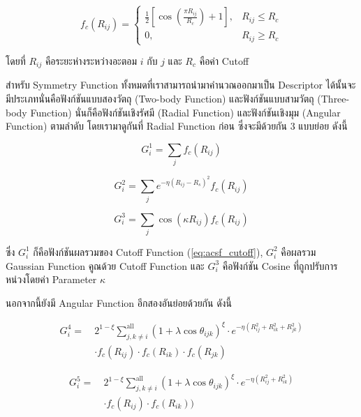 \begin{equation}
    \label{eq:acsf_cutoff}
    f_{c}(R_{ij}) = 
    \begin{cases}
        \frac{1}{2}[\cos(\frac{\pi R_{ij}}{R_{c}}) + 1], & R_{ij} \le R_{c} \\
        0,                                             & R_{ij} \ge R_{c}
    \end{cases}
\end{equation}

\noindent โดยที่ $R_{ij}$ คือระยะห่างระหว่างอะตอม $i$ กับ $j$ และ $R_{c}$ คือค่า Cutoff

สำหรับ Symmetry Function ทั้งหมดที่เราสามารถนำมาคำนวณออกมาเป็น Descriptor ได้นั้นจะมีประเภทนั่นคือฟังก์ชันแบบสองวัตถุ
(Two-body Function) และฟังก์ชันแบบสามวัตถุ (Three-body Function) นั่นก็คือฟังก์ชันเชิงรัศมี (Radial Function) และฟังก์ชันเชิงมุม 
(Angular Function) ตามลำดับ โดยเรามาดูกันที่ Radial Function ก่อน ซึ่งจะมีด้วยกัน 3 แบบย่อย ดังนี้

\begin{equation}
    G^{1}_{i} = \sum_{j} f_{c}(R_{ij})
\end{equation}

\begin{equation}
    G^{2}_{i} = \sum_{j} e^{-\eta(R_{ij} - R_{s})^{2}} f_{c}(R_{ij})
\end{equation}

\begin{equation}
    G^{3}_{i} = \sum_{j} \cos(\kappa R_{ij}) f_{c}(R_{ij})
\end{equation}

\noindent ซึ่ง $G^{1}_{i}$ ก็คือฟังก์ชันผลรวมของ Cutoff Function (\ref{eq:acsf_cutoff}), $G^{2}_{i}$ คือผลรวม Gaussian Function
คูณด้วย Cutoff Function และ $G^{3}_{i}$ คือฟังก์ชัน Cosine ที่ถูกปรับการหน่วงโดยค่า Parameter $\kappa$ 

นอกจากนี้ยังมี Angular Function อีกสองอันย่อยด้วยกัน ดังนี้

\begin{align}
    G^{4}_{i} =~&2^{1 - \xi}\sum^{\text{all}}_{j,k \neq i} (1+\lambda \cos \theta_{ijk})^{\xi}
    \cdot e^{-\eta(R^{2}_{ij} + R^{2}_{ik} + R^{2}_{jk})} \nonumber \\
    & \cdot f_{c}(R_{ij}) \cdot f_{c}(R_{ik}) \cdot f_{c}(R_{jk})
\end{align}

\begin{align}
    G^{5}_{i} =~&2^{1 - \xi}\sum^{\text{all}}_{j,k \neq i} (1+\lambda \cos \theta_{ijk})^{\xi}
    \cdot e^{-\eta(R^{2}_{ij} + R^{2}_{ik})} \nonumber \\
    & \cdot f_{c}(R_{ij}) \cdot f_{c}(R_{ik}))
\end{align}

